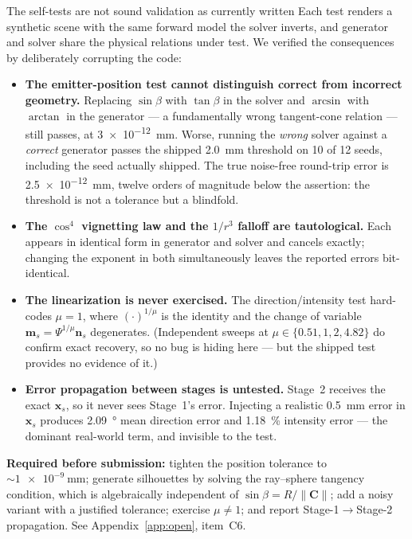 \documentclass[journal,10pt]{IEEEtran}
\newcommand{\vecn}{\bm{n}}
\newcommand{\vecx}{\bm{x}}
\newcommand{\vecm}{\bm{m}}
\begin{document}
\begin{todobox}{The self-tests are not sound validation as currently written}
Each test renders a synthetic scene with the same forward model the solver
inverts, and generator and solver share the physical relations under test. We
verified the consequences by deliberately corrupting the code:

\begin{itemize}
\item \textbf{The emitter-position test cannot distinguish correct from
incorrect geometry.} Replacing $\sin\beta$ with $\tan\beta$ in the solver and
$\arcsin$ with $\arctan$ in the generator --- a fundamentally wrong tangent-cone
relation --- still passes, at \SI{3e-12}{\milli\metre}. Worse, running the
\emph{wrong} solver against a \emph{correct} generator passes the shipped
\SI{2.0}{\milli\metre} threshold on 10 of 12 seeds, including the seed actually
shipped. The true noise-free round-trip error is \SI{2.5e-12}{\milli\metre},
twelve orders of magnitude below the assertion: the threshold is not a tolerance
but a blindfold.
\item \textbf{The $\cos^4$ vignetting law and the $1/r^3$ falloff are
tautological.} Each appears in identical form in generator and solver and
cancels exactly; changing the exponent in both simultaneously leaves the reported
errors bit-identical.
\item \textbf{The linearization is never exercised.} The direction/intensity test
hard-codes $\mu=1$, where $(\cdot)^{1/\mu}$ is the identity and the change of
variable $\vecm_s = \Psi^{1/\mu}\vecn_s$ degenerates. (Independent sweeps at
$\mu \in \{0.51, 1, 2, 4.82\}$ do confirm exact recovery, so no bug is hiding
here --- but the shipped test provides no evidence of it.)
\item \textbf{Error propagation between stages is untested.} Stage~2 receives the
exact $\vecx_s$, so it never sees Stage~1's error. Injecting a realistic
\SI{0.5}{\milli\metre} error in $\vecx_s$ produces \SI{2.09}{\degree} mean
direction error and \SI{1.18}{\percent} intensity error --- the dominant
real-world term, and invisible to the test.
\end{itemize}

\textbf{Required before submission:} tighten the position tolerance to
${\sim}\SI{1e-9}{\milli\metre}$; generate silhouettes by solving the ray--sphere
tangency condition, which is algebraically independent of
$\sin\beta = R/\lVert\bm{C}\rVert$; add a noisy variant with a justified
tolerance; exercise $\mu\neq1$; and report Stage-1$\to$Stage-2 propagation. See
Appendix~\ref{app:open}, item~C6.
\end{todobox}
\end{document}
